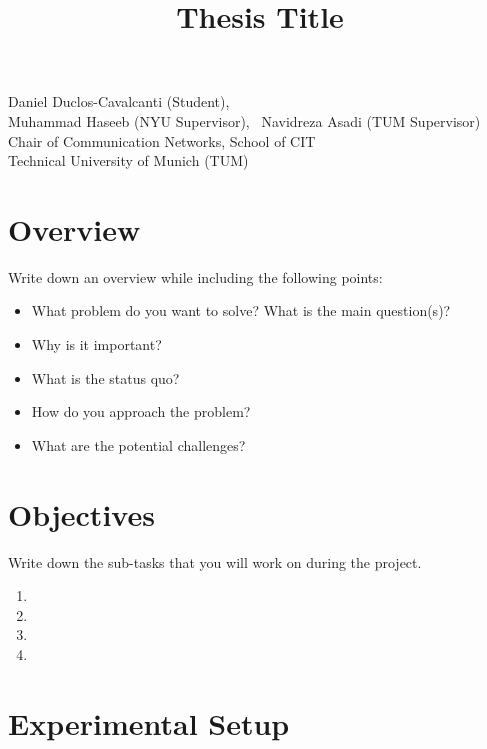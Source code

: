 \documentclass{article}
\title{Thesis Title}
\makeatletter
\renewcommand{\maketitle}{%
    \thispagestyle{fancy}%
    \begin{center}
        \Large\bfseries\@title
    \end{center}
    \vspace{-0.25cm}
    \begin{center}
        Daniel Duclos-Cavalcanti (Student),
        \\
        Muhammad Haseeb (NYU Supervisor),
        ~Navidreza Asadi (TUM Supervisor) 
        \\Chair of Communication Networks, School of CIT
        \\Technical University of Munich (TUM)
    \end{center}
}
\makeatother
\begin{document}
\maketitle

\section{Overview}
        
    Write down an overview while including the following points:
    \begin{itemize}
        \item What problem do you want to solve? What is the main question(s)?
        \item Why is it important?
        \item What is the status quo?
        \item How do you approach the problem?
        \item What are the potential challenges?
    \end{itemize}
 
\section{Objectives}
    Write down the sub-tasks that you will work on during the project.
    \begin{enumerate}
        \item 
        \item 
        \item 
        \item 
    \end{enumerate}

\section{Experimental Setup}
    
    
\end{document}
